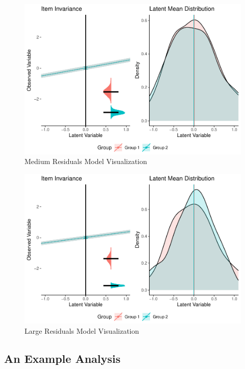 \documentclass[
  man]{apa6}
\begin{document}
\begin{figure}
\centering
\includegraphics{manuscript_files/figure-latex/med-res-pic-1.pdf}
\caption{\label{fig:med-res-pic}Medium Residuals Model Visualization}
\end{figure}

\begin{figure}
\centering
\includegraphics{manuscript_files/figure-latex/large-res-pic-1.pdf}
\caption{\label{fig:large-res-pic}Large Residuals Model Visualization}
\end{figure}

\hypertarget{an-example-analysis}{%
\subsection{An Example Analysis}\label{an-example-analysis}}
\end{document}
